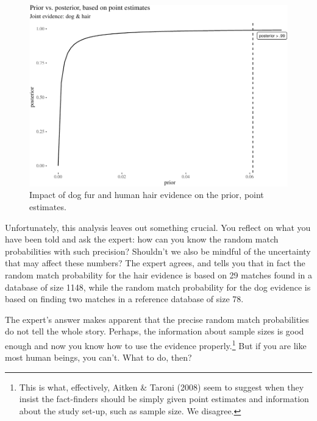 \documentclass[
  10pt,
  dvipsnames,enabledeprecatedfontcommands]{scrartcl}
\begin{document}
\begin{figure}[H]

\begin{center}\includegraphics[width=0.6\linewidth]{imprecision_philosophical_paper2_files/figure-latex/impactOfPoint4-1} \end{center}
\caption{Impact of dog fur and human hair evidence on the prior, point estimates.}
\label{fig:impactOfPoint}
\end{figure}

Unfortunately, this analysis leaves out something crucial. You reflect
on what you have been told and ask the expert: how can you know the
random match probabilities with such precision? Shouldn't we also be
mindful of the uncertainty that may affect these numbers? The expert
agrees, and tells you that in fact the random match probability for the
hair evidence is based on 29 matches found in a database of size 1148,
while the random match probability for the dog evidence is based on
finding two matches in a reference database of size 78.

The expert's answer makes apparent that the precise random match
probabilities do not tell the whole story. Perhaps, the information
about sample sizes is good enough and now you know how
to
use the evidence properly.\footnote{This is what, effectively, Aitken \&
  Taroni (2008) seem to suggest when they insist the fact-finders should
  be simply given point estimates and information about the study
  set-up, such as sample size. We disagree.} But if you are like most
human beings, you can't. What to do, then?
\end{document}
